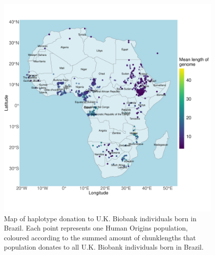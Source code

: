 \begin{figure}[htp]
    \centering
    \includegraphics[width=1.0\textwidth]{../images/appendix/haplotype_map_Brazil.pdf}
    \caption{Map of haplotype donation to U.K. Biobank individuals born in Brazil. Each point represents one Human Origins population, coloured according to the summed amount of chunklengths that population donates to all U.K. Biobank individuals born in Brazil.}
    \label{fig:haplotype_map_Brazil}
\end{figure}

